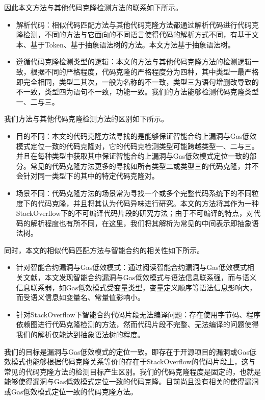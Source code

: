 因此本文方法与其他代码克隆检测方法的联系如下所示。

\begin{itemize}
    \item 解析代码：相似代码匹配方法与其他代码克隆方法都通过解析代码进行代码克隆检测，不同的方法与它面向的不同语言使得代码的解析方式不同，有基于文本、基于Token、基于抽象语法树的方法。本文方法基于抽象语法树。
    \item 遵循代码克隆检测类型的逻辑：本文的方法与其他代码克隆方法的检测逻辑一致，根据不同的严格程度，代码克隆的严格程度分为四种，其中类型一最严格即完全相同，类型二其次，一般为名称的不一致，类型三为语句增删改导致的不一致，类型四为语句不一致，功能一致。我们的方法能够检测代码克隆类型一、二与三。
\end{itemize}

我们方法与其他代码克隆检测方法的区别如下所示。

\begin{itemize}
    \item 目的不同：本文的代码克隆方法寻找的是能够保证智能合约上漏洞与Gas低效模式定位一致的代码克隆对，它的代码克检测类型可能跨越类型一、二与三。并且在每种类型中获取其中保证智能合约上漏洞与Gas低效模式定位一致的部分。常见的代码克隆方法更多的寻找如所有类型二或类型三的代码克隆，并不会针对同一类型下的其中的特定代码克隆对。
    \item 场景不同：代码克隆方法的场景常为寻找一个或多个完整代码系统下的不同粒度下的代码克隆，并且将其认为代码异味进行研究。本文的方法将其作为一种StackOverflow下的不可编译代码片段的研究方法；由于不可编译的特点，对代码的解析程度也有所不同，在这里，我们将其解析为常见的中间表示即抽象语法树。
\end{itemize}

同时，本文的相似代码匹配方法与智能合约的相关性如下所示。

\begin{itemize}
    \item 针对智能合约漏洞与Gas低效模式：通过阅读智能合约漏洞与Gas低效模式相关文献，本文发现智能合约漏洞与Gas低效模式与语法信息联系强，而与语义信息联系弱，如Gas低效模式受变量类型，变量定义顺序等语法信息影响大，而受语义信息如变量名、常量值影响小。
    \item 针对StackOverflow下智能合约代码片段无法编译问题：存在使用字节码、程序依赖图进行代码克隆检测的方法，然而代码片段不完整、无法编译的问题使得我们的解析仅能达到抽象语法树的程度。
\end{itemize}

我们的目标是漏洞与Gas低效模式的定位一致。即存在于开源项目的漏洞或Gas低效模式也能够根据代码克隆关系等价的存在于StackOverflow的代码片段上，这与常见的代码克隆方法的检测目标产生区别。我们的代码克隆程度是固定的，也就是能够使得漏洞与Gas低效模式定位一致的代码克隆。目前尚且没有相关的使得漏洞或Gas低效模式定位一致的代码克隆方法。

